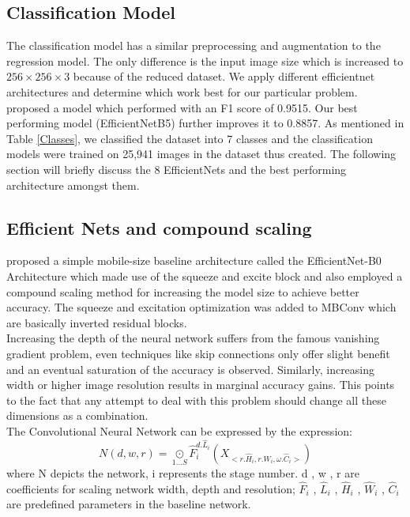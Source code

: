 \documentclass[fleqn,usenatbib]{mnras}
\begin{document}
\subsection{Classification Model}
\hspace{0.25 in}The classification model has a similar preprocessing and augmentation to the regression model. The only difference is the input image size which is increased to $256\times256\times3$ because of the reduced dataset. We apply different efficientnet architectures and determine which work best for our particular problem. 
\citet{dai2018galaxy} proposed a model which performed with an F1 score of 0.9515. Our best performing model (EfficientNetB5) further improves it to 0.8857.
As mentioned in Table \ref{Classes}, we classified the dataset into 7 classes and the classification models were trained on 25,941 images in the dataset thus created. The following section will briefly discuss the 8 EfficientNets and the best performing architecture amongst them.
\subsection{Efficient Nets and compound scaling}
\hspace{0.25 in} \citet{efficientnet} proposed a simple mobile-size baseline architecture called the EfficientNet-B0 Architecture which made use of the squeeze and excite block and also employed a compound scaling method for increasing the model size to achieve better accuracy. The squeeze and excitation optimization was added to MBConv which are basically inverted residual blocks.\\
\hspace*{0.25 in}Increasing the depth of the neural network suffers from the famous vanishing gradient problem, even techniques like skip connections only offer slight benefit and an eventual saturation of the accuracy is observed. Similarly, increasing width or higher image resolution results in marginal accuracy gains. This points to the fact that any attempt to deal with this problem should change all these dimensions as a combination.\\
The Convolutional Neural Network can be expressed by the expression:
\begin{equation}   
    N(d,w,r)= \underset{1...S}{\odot}  \hat{F}_{i}^{d.\hat{L}_{i}} (X_{<r.\hat{H}_{i} , r.\hat{W}_{i} , \omega.\hat{C}_{i} >} )
\end{equation}
where N depicts the network, i represents the stage number. d , w , r are coefficients for scaling network width, depth and resolution; ${ \hat{F}_{i} }$ , ${ \hat{L}_{i} }$ , ${ \hat{H}_{i} }$ , ${ \hat{W}_{i} }$ , ${ \hat{C}_{i} }$  are predefined parameters in the baseline network.\\
\end{document}
